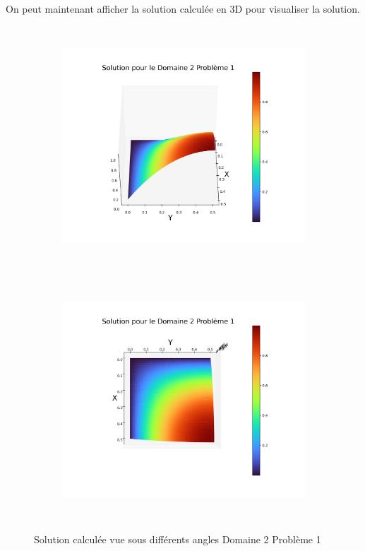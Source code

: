 \documentclass[a4paper, 12pt, french]{report}
\begin{document}
On peut maintenant afficher la solution calculée en 3D pour visualiser la solution.
\begin{figure}[!h]
    \centering
    \begin{subfigure}{0.48\textwidth}
    	\centering
        \includegraphics[height=9cm]{../Images/Figures_Calculees/sol3D21.png}
    \end{subfigure}
    \begin{subfigure}{0.48\textwidth}
    \centering
        \includegraphics[height=9cm]{../Images/Figures_Calculees/sol3DVH21.png}
    \end{subfigure}
    \caption{Solution calculée vue sous différents angles Domaine 2 Problème 1 }
\end{figure}
\newpage

\end{document}
